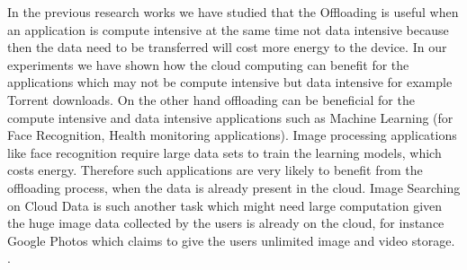 \documentclass[12pt]{report}
\begin{document}
In the previous research works we have studied that the Offloading is useful when an application is compute intensive at the same time not data intensive because then the data need to be transferred will cost more energy to the device. 
In our experiments we have shown how the cloud computing can benefit for the applications which may not be compute intensive but data intensive for example Torrent downloads. On the other hand offloading can be beneficial for the compute intensive and data intensive applications such as Machine Learning (for Face Recognition, Health monitoring applications). Image processing applications like face recognition require large data sets to train the learning models, which costs energy. Therefore such applications are very likely to benefit from the offloading process, when the data is already present in the cloud. Image Searching on Cloud Data is such another task which might need large computation given the huge image data collected by the users is already on the cloud, for instance Google Photos which claims to give the users unlimited image and video storage. . 


\end{document}
